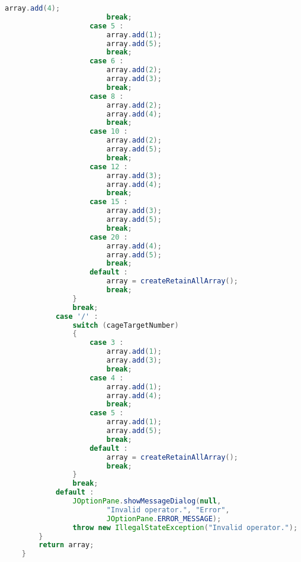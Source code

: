\begin{lstlisting}[language=Java,basicstyle=\tiny,caption=SolverRuleBased.java]
                        array.add(4);
                        break;
                    case 5 :
                        array.add(1);
                        array.add(5);
                        break;
                    case 6 :
                        array.add(2);
                        array.add(3);
                        break;
                    case 8 :
                        array.add(2);
                        array.add(4);
                        break;
                    case 10 :
                        array.add(2);
                        array.add(5);
                        break;
                    case 12 :
                        array.add(3);
                        array.add(4);
                        break;
                    case 15 :
                        array.add(3);
                        array.add(5);
                        break;
                    case 20 :
                        array.add(4);
                        array.add(5);
                        break;
                    default :
                        array = createRetainAllArray();
                        break;
                }
                break;
            case '/' :
                switch (cageTargetNumber)
                {
                    case 3 :
                        array.add(1);
                        array.add(3);
                        break;
                    case 4 :
                        array.add(1);
                        array.add(4);
                        break;
                    case 5 :
                        array.add(1);
                        array.add(5);
                        break;
                    default :
                        array = createRetainAllArray();
                        break;
                }
                break;
            default :
                JOptionPane.showMessageDialog(null, 
                        "Invalid operator.", "Error", 
                        JOptionPane.ERROR_MESSAGE);
                throw new IllegalStateException("Invalid operator.");
        }
        return array;
    }
    

\end{lstlisting}
